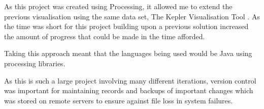 As this project was created using Processing, it allowed me to extend the
previous visualisation using the same data set, The Kepler Visualisation Tool
\cite{kepler_github, kepler_article}. As the time was short for this project
building upon a previous solution increased the amount of progress that could be
made in the time afforded.

Taking this approach meant that the languages being used would be Java using
processing libraries. 

As this is such a large project involving many different iterations, version
control was important for maintaining records and backups of important changes
which was stored on remote servers to ensure against file loss in system
failures.

